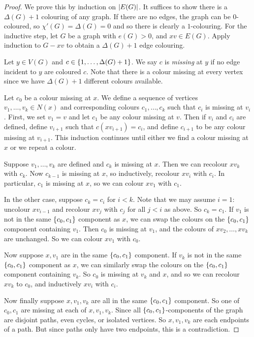 \begin{proof}
	We prove this by induction on \( \abs{E(G)} \).
	It suffices to show there is a \( \Delta(G) + 1 \) colouring of any graph.
	If there are no edges, the graph can be \( 0 \)-coloured, so \( \chi'(G) = \Delta(G) = 0 \) and so there is clearly a \( 1 \)-colouring.
	For the inductive step, let \( G \) be a graph with \( e(G) > 0 \), and \( xv \in E(G) \).
	Apply induction to \( G - xv \) to obtain a \( \Delta(G) + 1 \) edge colouring.

	Let \( y \in V(G) \) and \( c \in \qty{1, \dots, \Delta(G) + 1} \).
	We say \( c \) is \emph{missing} at \( y \) if no edge incident to \( y \) are coloured \( c \).
	Note that there is a colour missing at every vertex since we have \( \Delta(G) + 1 \) different colours available.

	Let \( c_0 \) be a colour missing at \( x \).
	We define a sequence of vertices \( v_1, \dots, v_k \in N(x) \) and corresponding colours \( c_1, \dots, c_k \) such that \( c_i \) is missing at \( v_i \).
	First, we set \( v_1 = v \) and let \( c_1 \) be any colour missing at \( v \).
	Then if \( v_i \) and \( c_i \) are defined, define \( v_{i+1} \) such that \( c(xv_{i+1}) = c_i \), and define \( c_{i+1} \) to be any colour missing at \( v_{i+1} \).
	This induction continues until either we find a colour missing at \( x \) or we repeat a colour.

	Suppose \( v_1, \dots, v_k \) are defined and \( c_k \) is missing at \( x \).
	Then we can recolour \( xv_k \) with \( c_k \).
	Now \( c_{k-1} \) is missing at \( x \), so inductively, recolour \( xv_i \) with \( c_i \).
	In particular, \( c_1 \) is missing at \( x \), so we can colour \( xv_1 \) with \( c_1 \).

	In the other case, suppose \( c_k = c_i \) for \( i < k \).
	Note that we may assume \( i = 1 \): uncolour \( xv_{i-1} \) and recolour \( xv_j \) with \( c_j \) for all \( j < i \) as above.
	So \( c_k = c_1 \).
	If \( v_1 \) is not in the same \( \qty{c_0, c_1} \) component as \( x \), we can swap the colours on the \( \qty{c_0, c_1} \) component containing \( v_1 \).
	Then \( c_0 \) is missing at \( v_1 \), and the colours of \( xv_2, \dots, xv_k \) are unchanged.
	So we can colour \( xv_1 \) with \( c_0 \).

	Now suppose \( x, v_1 \) are in the same \( \qty{c_0, c_1} \) component.
	If \( v_k \) is not in the same \( \qty{c_0, c_1} \) component as \( x \), we can similarly swap the colours on the \( \qty{c_0, c_1} \) component containing \( v_k \).
	So \( c_0 \) is missing at \( v_k \) and \( x \), and so we can recolour \( xv_k \) to \( c_0 \), and inductively \( xv_i \) with \( c_i \).

	Now finally suppose \( x, v_1, v_k \) are all in the same \( \qty{c_0, c_1} \) component.
	So one of \( c_0, c_1 \) are missing at each of \( x, v_1, v_k \).
	Since all \( \qty{c_0, c_1} \)-components of the graph are disjoint paths, even cycles, or isolated vertices.
	So \( x, v_1, v_k \) are each endpoints of a path.
	But since paths only have two endpoints, this is a contradiction.
\end{proof}

